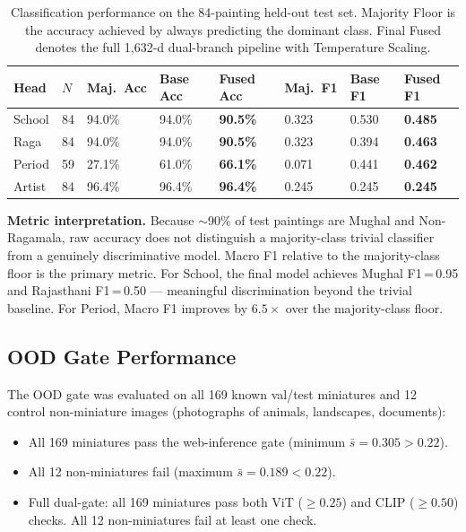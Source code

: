 \documentclass[12pt, a4paper, twoside]{article}
\begin{document}
\begin{table}[H]
  \centering
  \caption{Classification performance on the 84-painting held-out test set. Majority Floor is the accuracy achieved by always predicting the dominant class. Final Fused denotes the full 1,632-d dual-branch pipeline with Temperature Scaling.}
  \label{tab:results}
  \begin{tabularx}{\linewidth}{L{1.6cm} C{1.0cm} C{1.4cm} C{1.6cm} C{1.6cm} C{1.4cm} C{1.6cm} C{1.6cm}}
    \toprule
    \textbf{Head} & \textbf{$N$} & \textbf{Maj.\ Acc} & \textbf{Base Acc} & \textbf{Fused Acc} & \textbf{Maj.\ F1} & \textbf{Base F1} & \textbf{Fused F1}\\
    \midrule
    School  & 84 & 94.0\% & 94.0\% & \textbf{90.5\%} & 0.323 & 0.530 & \textbf{0.485}\\
    Raga    & 84 & 94.0\% & 94.0\% & \textbf{90.5\%} & 0.323 & 0.394 & \textbf{0.463}\\
    Period  & 59 & 27.1\% & 61.0\% & \textbf{66.1\%} & 0.071 & 0.441 & \textbf{0.462}\\
    Artist  & 84 & 96.4\% & 96.4\% & \textbf{96.4\%} & 0.245 & 0.245 & \textbf{0.245}\\
    \bottomrule
  \end{tabularx}
\end{table}

\begin{notebox}
  \textbf{Metric interpretation.} Because $\sim$90\% of test paintings are Mughal and Non-Ragamala, raw accuracy does not distinguish a majority-class trivial classifier from a genuinely discriminative model. Macro F1 relative to the majority-class floor is the primary metric. For School, the final model achieves Mughal F1\,=\,0.95 and Rajasthani F1\,=\,0.50 — meaningful discrimination beyond the trivial baseline. For Period, Macro F1 improves by $6.5\times$ over the majority-class floor.
\end{notebox}

\subsection{OOD Gate Performance}

The OOD gate was evaluated on all 169 known val/test miniatures and 12 control non-miniature images (photographs of animals, landscapes, documents):

\begin{itemize}
  \item All 169 miniatures pass the web-inference gate (minimum $\bar{s} = 0.305 > 0.22$).
  \item All 12 non-miniatures fail (maximum $\bar{s} = 0.189 < 0.22$).
  \item Full dual-gate: all 169 miniatures pass both ViT ($\geq 0.25$) and CLIP ($\geq 0.50$) checks. All 12 non-miniatures fail at least one check.
\end{itemize}
\end{document}
